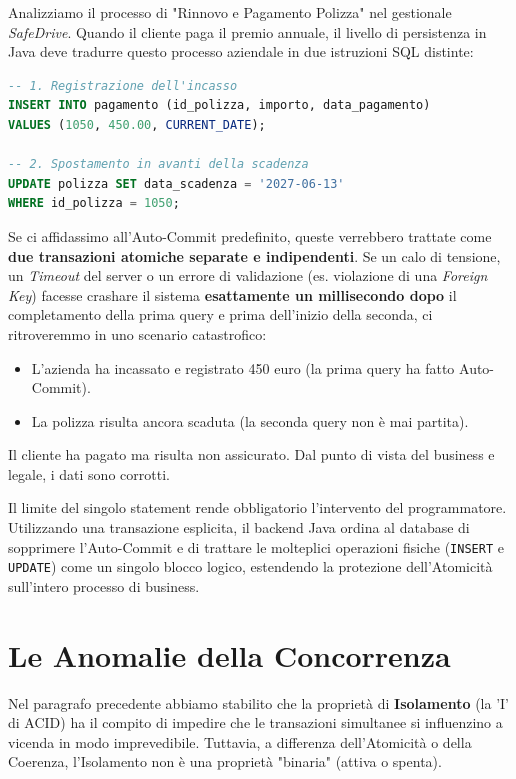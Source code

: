 \begin{example}
Analizziamo il processo di "Rinnovo e Pagamento Polizza" nel gestionale \textit{SafeDrive}. Quando il cliente paga il premio annuale, il livello di persistenza in Java deve tradurre questo processo aziendale in due istruzioni SQL distinte:
\begin{lstlisting}[language=SQL, basicstyle=\ttfamily\small, keywordstyle=\color{blue}\bfseries]
-- 1. Registrazione dell'incasso
INSERT INTO pagamento (id_polizza, importo, data_pagamento) 
VALUES (1050, 450.00, CURRENT_DATE);

-- 2. Spostamento in avanti della scadenza
UPDATE polizza SET data_scadenza = '2027-06-13' 
WHERE id_polizza = 1050;
\end{lstlisting}

Se ci affidassimo all'Auto-Commit predefinito, queste verrebbero trattate come \textbf{due transazioni atomiche separate e indipendenti}. 
Se un calo di tensione, un \textit{Timeout} del server o un errore di validazione (es. violazione di una \textit{Foreign Key}) facesse crashare il sistema \textbf{esattamente un millisecondo dopo} il completamento della prima query e prima dell'inizio della seconda, ci ritroveremmo in uno scenario catastrofico:
\begin{itemize}
    \item L'azienda ha incassato e registrato 450 euro (la prima query ha fatto Auto-Commit).
    \item La polizza risulta ancora scaduta (la seconda query non è mai partita).
\end{itemize}
Il cliente ha pagato ma risulta non assicurato. Dal punto di vista del business e legale, i dati sono corrotti.
\end{example}

Il limite del singolo statement rende obbligatorio l'intervento del programmatore. Utilizzando una transazione esplicita, il backend Java ordina al database di sopprimere l'Auto-Commit e di trattare le molteplici operazioni fisiche (\texttt{INSERT} e \texttt{UPDATE}) come un singolo blocco logico, estendendo la protezione dell'Atomicità sull'intero processo di business.

\section{Le Anomalie della Concorrenza}

Nel paragrafo precedente abbiamo stabilito che la proprietà di \textbf{Isolamento} (la 'I' di ACID) ha il compito di impedire che le transazioni simultanee si influenzino a vicenda in modo imprevedibile. Tuttavia, a differenza dell'Atomicità o della Coerenza, l'Isolamento non è una proprietà "binaria" (attiva o spenta). 

